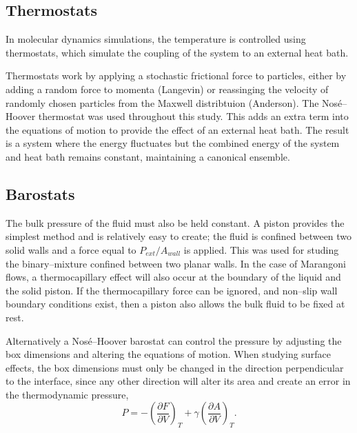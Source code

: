 \subsection{Thermostats}\label{Thermostats}
In molecular dynamics simulations, the temperature is controlled using thermostats, which simulate the coupling of the system to an external heat bath.

Thermostats work by applying a stochastic frictional force to particles, either by adding a random force to momenta (Langevin)\cite{Langevin} or reassinging the velocity of randomly chosen particles from the Maxwell distribtuion (Anderson)\cite{AndersonTherm}.
The Nos\'{e}--Hoover thermostat was used throughout this study.
This adds an extra term into the equations of motion to provide the effect of an external heat bath.\cite{NoseHoover1, NoseHoover2, NoseHoover3}
The result is a system where the energy fluctuates but the combined energy of the system and heat bath remains constant, maintaining a canonical ensemble.

\subsection{Barostats}\label{Barostats}
The bulk pressure of the fluid must also be held constant.
A piston provides the simplest method and is relatively easy to create; the fluid is confined between two solid walls and a force equal to $P_{ext} / A_{wall}$ is applied.
This was used for studing the binary--mixture confined between two planar walls.
In the case of Marangoni flows, a thermocapillary effect will also occur at the boundary of the liquid and the solid piston.
If the thermocapillary force can be ignored, and non--slip wall boundary conditions exist, then a piston also allows the bulk fluid to be fixed at rest.

Alternatively a Nos\'{e}--Hoover barostat can control the pressure by adjusting the box dimensions and altering the equations of motion. \cite{NoseHoover1, NoseHoover2, NoseHoover3}
When studying surface effects, the box dimensions must only be changed in the direction perpendicular to the interface, since any other direction will alter its area and create an error in the thermodynamic pressure,
\begin{equation}
P = - \left( \frac{\partial F}{\partial V} \right)_{T} + \gamma \left( \frac{\partial A}{\partial V} \right)_{T}.
\end{equation}

